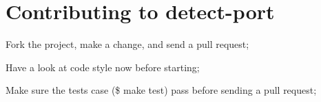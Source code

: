 \chapter{Contributing to detect-\/port}
\hypertarget{md_node__modules_2detect-port-alt_2CONTRIBUTING}{}\label{md_node__modules_2detect-port-alt_2CONTRIBUTING}
\label{md_node__modules_2detect-port-alt_2CONTRIBUTING_autotoc_md9448}%
%

\begin{DoxyItemize}
\item Fork the project, make a change, and send a pull request;
\item Have a look at code style now before starting;
\item Make sure the tests case ({\ttfamily \$ make test}) pass before sending a pull request; 
\end{DoxyItemize}